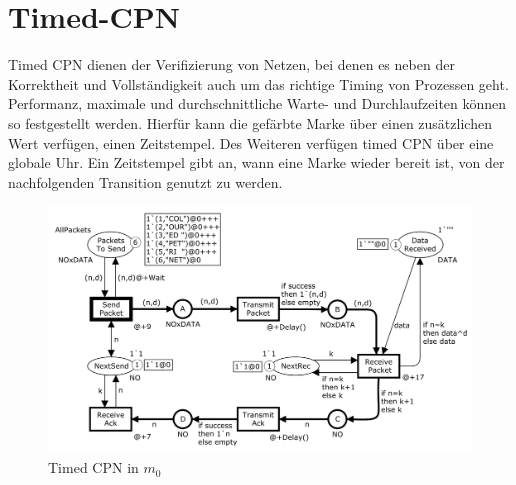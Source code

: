 \documentclass[11pt,onecolumn,a4paper,DIV=calc]{scrartcl}
\begin{document}
\section{Timed-CPN}
Timed CPN dienen der Verifizierung von Netzen, bei denen es neben der Korrektheit und Vollständigkeit auch um das richtige Timing von Prozessen geht. Performanz, maximale und durchschnittliche Warte- und Durchlaufzeiten können so festgestellt werden. 
Hierfür kann die gefärbte Marke über einen zusätzlichen Wert verfügen, einen Zeitstempel. Des Weiteren verfügen timed CPN über eine globale Uhr. Ein Zeitstempel gibt an, wann eine Marke wieder bereit ist, von der nachfolgenden Transition genutzt zu werden.
\begin{figure}[H]
    \centering
    \includegraphics[scale=0.35]{tim0.PNG}
    \caption{Timed CPN in $m_0$}
    \label{fig:tim0}
\end{figure}
\end{document}
